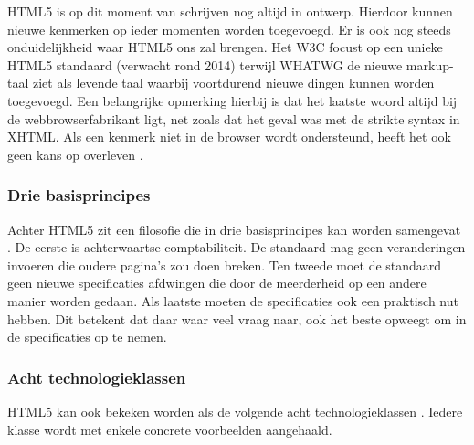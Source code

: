 HTML5 is op dit moment van schrijven nog altijd in ontwerp. Hierdoor kunnen nieuwe kenmerken op ieder momenten worden toegevoegd.  Er is ook nog steeds onduidelijkheid waar HTML5 ons zal brengen.  Het W3C focust op een unieke HTML5 standaard (verwacht rond 2014) terwijl WHATWG de nieuwe markup-taal ziet als levende taal waarbij voortdurend  nieuwe dingen kunnen worden toegevoegd. Een belangrijke opmerking hierbij is dat het laatste woord altijd bij de webbrowserfabrikant ligt, net zoals dat het geval was met de strikte syntax in XHTML. Als een kenmerk niet in de browser wordt ondersteund, heeft het ook geen kans op overleven \cite{MacDonald2011}.

\subsubsection{Drie basisprincipes}
Achter HTML5 zit een filosofie die in drie basisprincipes kan worden samengevat \cite{MacDonald2011}.  De eerste is achterwaartse comptabiliteit. De standaard mag geen veranderingen invoeren die oudere pagina's zou doen breken. Ten tweede moet de standaard geen nieuwe specificaties afdwingen die door de meerderheid op een andere manier worden gedaan. Als laatste moeten de specificaties ook een praktisch nut hebben. Dit betekent dat daar waar veel vraag naar, ook het beste opweegt om in de specificaties op te nemen.

\subsubsection{Acht technologieklassen}
HTML5 kan ook bekeken worden als de volgende acht technologieklassen \cite{W3C2012}. Iedere klasse wordt met enkele concrete voorbeelden aangehaald.

